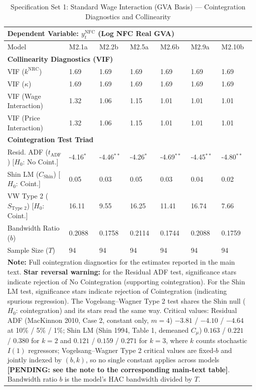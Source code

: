 \begin{table}[H]
\centering
\setlength{\tabcolsep}{2.5pt}
\caption{Specification Set 1: Standard Wage Interaction (GVA Basis) --- Cointegration Diagnostics and Collinearity}
\label{tab:specB_set1_gva_triad}
\scriptsize
\begin{tabular}{p{3.8cm}p{1.1cm}p{1.1cm}p{1.1cm}p{1.1cm}p{1.1cm}p{1.1cm}}
\toprule
\multicolumn{7}{l}{\textbf{Dependent Variable: $y_t^{\text{NFC}}$ (Log NFC Real GVA)}} \\
\midrule
Model & M2.1a & M2.2b & M2.5a & M2.6b & M2.9a & M2.10b \\
\midrule
\multicolumn{7}{l}{\textbf{Collinearity Diagnostics (VIF)}} \\
VIF ($k^{\text{NRC}}$) & 1.69 & 1.69 & 1.69 & 1.69 & 1.69 & 1.69 \\
VIF ($\kappa$) & 1.69 & 1.69 & 1.69 & 1.69 & 1.69 & 1.69 \\
VIF (Wage Interaction) & 1.32 & 1.06 & 1.15 & 1.01 & 1.01 & 1.01 \\
VIF (Price Interaction) & 1.32 & 1.06 & 1.15 & 1.01 & 1.01 & 1.01 \\
\midrule
\multicolumn{7}{l}{\textbf{Cointegration Test Triad}} \\
Resid. ADF ($t_{\text{ADF}}$) [$H_0$: No Coint.] & -4.16$^{*}$ & -4.46$^{**}$ & -4.26$^{*}$ & -4.69$^{**}$ & -4.45$^{**}$ & -4.80$^{**}$ \\
Shin LM ($C_{\text{Shin}}$) [$H_0$: Coint.] & 0.05 & 0.03 & 0.05 & 0.03 & 0.04 & 0.02 \\
VW Type 2 ($S_{\text{Type 2}}$) [$H_0$: Coint.] & 16.11 & 9.55 & 16.25 & 11.41 & 16.74 & 7.66 \\
\midrule
Bandwidth Ratio ($b$) & 0.2088 & 0.1758 & 0.2114 & 0.1744 & 0.2088 & 0.1759 \\
Sample Size ($T$) & 94 & 94 & 94 & 94 & 94 & 94 \\
\bottomrule
\multicolumn{7}{p{15cm}}{\footnotesize \textbf{Note:} Full cointegration diagnostics for the estimates reported in the main text. \textbf{Star reversal warning:} for the Residual ADF test, significance stars indicate rejection of No Cointegration (supporting cointegration). For the Shin LM test, significance stars indicate rejection of Cointegration (indicating spurious regression). The Vogelsang--Wagner Type 2 test shares the Shin null ($H_0$: cointegration) and its stars read the same way. Critical values: Residual ADF (MacKinnon 2010, Case 2, constant only, $m=4$) $-3.81$ / $-4.10$ / $-4.64$ at 10\% / 5\% / 1\%; Shin LM (Shin 1994, Table 1, demeaned $C_\mu$) $0.163$ / $0.221$ / $0.380$ for $k=2$ and $0.121$ / $0.159$ / $0.271$ for $k=3$, where $k$ counts stochastic $I(1)$ regressors; Vogelsang--Wagner Type 2 critical values are fixed-$b$ and jointly indexed by $(b, k)$, so no single constant applies across models \textbf{[PENDING: see the note to the corresponding main-text table]}. Bandwidth ratio $b$ is the model's HAC bandwidth divided by $T$.} \\
\end{tabular}
\end{table}
